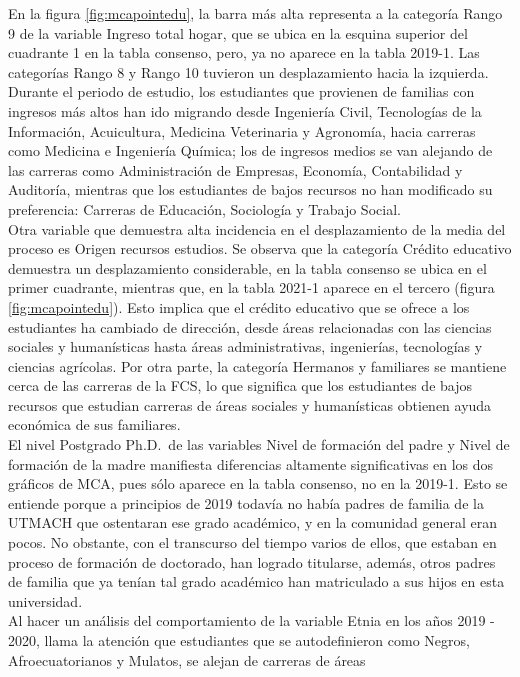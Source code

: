 \documentclass[water,article,submit,moreauthors,pdftex]{mdpi}
\begin{document}
En la figura \ref{fig:mcapointedu}, la barra más alta representa a la
categoría Rango 9 de la variable Ingreso total hogar, que se ubica en la
esquina superior del cuadrante 1 en la tabla consenso, pero, ya no
aparece en la tabla 2019-1. Las categorías Rango 8 y Rango 10 tuvieron
un desplazamiento hacia la izquierda. Durante el periodo de estudio, los
estudiantes que provienen de familias con ingresos más altos han ido
migrando desde Ingeniería Civil, Tecnologías de la Información,
Acuicultura, Medicina Veterinaria y Agronomía, hacia carreras como
Medicina e Ingeniería Química; los de ingresos medios se van alejando de
las carreras como Administración de Empresas, Economía, Contabilidad y
Auditoría, mientras que los estudiantes de bajos recursos no han
modificado su preferencia: Carreras de Educación, Sociología y Trabajo
Social.\\
Otra variable que demuestra alta incidencia en el desplazamiento de la
media del proceso es Origen recursos estudios. Se observa que la
categoría Crédito educativo demuestra un desplazamiento considerable, en
la tabla consenso se ubica en el primer cuadrante, mientras que, en la
tabla 2021-1 aparece en el tercero (figura \ref{fig:mcapointedu}). Esto
implica que el crédito educativo que se ofrece a los estudiantes ha
cambiado de dirección, desde áreas relacionadas con las ciencias
sociales y humanísticas hasta áreas administrativas, ingenierías,
tecnologías y ciencias agrícolas. Por otra parte, la categoría Hermanos
y familiares se mantiene cerca de las carreras de la FCS, lo que
significa que los estudiantes de bajos recursos que estudian carreras de
áreas sociales y humanísticas obtienen ayuda económica de sus
familiares.\\
El nivel Postgrado Ph.D.~de las variables Nivel de formación del padre y
Nivel de formación de la madre manifiesta diferencias altamente
significativas en los dos gráficos de MCA, pues sólo aparece en la tabla
consenso, no en la 2019-1. Esto se entiende porque a principios de 2019
todavía no había padres de familia de la UTMACH que ostentaran ese grado
académico, y en la comunidad general eran pocos. No obstante, con el
transcurso del tiempo varios de ellos, que estaban en proceso de
formación de doctorado, han logrado titularse, además, otros padres de
familia que ya tenían tal grado académico han matriculado a sus hijos en
esta universidad.\\
Al hacer un análisis del comportamiento de la variable Etnia en los años
2019 - 2020, llama la atención que estudiantes que se autodefinieron
como Negros, Afroecuatorianos y Mulatos, se alejan de carreras de áreas
\end{document}
